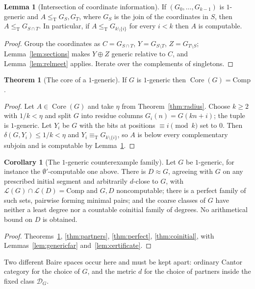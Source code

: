 \documentclass[11pt,letterpaper]{article}
\theoremstyle{definition}
\newtheorem{theorem}[definition]{Theorem}
\newtheorem{lemma}[definition]{Lemma}
\newtheorem{corollary}[definition]{Corollary}
\numberwithin{equation}{section}
\newcommand{\leT}{\le_{\mathrm T}}
\newcommand{\eqT}{\equiv_{\mathrm T}}
\newcommand{\DX}[1]{\mathcal D_{#1}}
\newcommand{\Low}{\mathcal L}
\newcommand{\Core}{\operatorname{Core}}
\newcommand{\Comp}{\mathrm{Comp}}
\newcommand{\src}[1]{\leavevmode{\sffamily\footnotesize\color{Steel}[#1]}}
\begin{document}
\begin{lemma}[Intersection of coordinate information]\label{lem:intersect}\src{R1}
If $(G_0,\dots,G_{k-1})$ is $1$-generic and $A\leT G_S,G_T$, where $G_S$ is the join of the coordinates in $S$, then $A\leT G_{S\cap T}$. In particular, if $A\leT G_{k\setminus\{i\}}$ for every $i<k$ then $A$ is computable.
\end{lemma}
\begin{proof}
Group the coordinates as $C=G_{S\cap T}$, $Y=G_{S\setminus T}$, $Z=G_{T\setminus S}$; Lemma~\ref{lem:sections} makes $Y\oplus Z$ generic relative to $C$, and Lemma~\ref{lem:relmeet} applies. Iterate over the complements of singletons.
\end{proof}

\begin{theorem}[The core of a $1$-generic]\label{thm:genericcore}\src{R1; = \cite[Theorem~4.2]{HJKS}}
If $G$ is $1$-generic then $\Core(G)=\Comp$.
\end{theorem}
\begin{proof}
Let $A\in\Core(G)$ and take $\eta$ from Theorem~\ref{thm:radius}. Choose $k\ge2$ with $1/k<\eta$ and split $G$ into residue columns $G_i(n)=G(kn+i)$; the tuple is $1$-generic. Let $Y_i$ be $G$ with the bits at positions $\equiv i\pmod k$ set to $0$. Then $\delta(G,Y_i)\le1/k<\eta$ and $Y_i\eqT G_{k\setminus\{i\}}$, so $A$ is below every complementary subjoin and is computable by Lemma~\ref{lem:intersect}.
\end{proof}

\begin{corollary}[The $1$-generic counterexample family]\label{cor:generic}\src{R1}
Let $G$ be $1$-generic, for instance the $\emptyset'$-computable one above. There is $D\approx G$, agreeing with $G$ on any prescribed initial segment and arbitrarily $d$-close to $G$, with $\Low(G)\cap\Low(D)=\Comp$ and $G,D$ noncomputable; there is a perfect family of such sets, pairwise forming minimal pairs; and the coarse classes of $G$ have neither a least degree nor a countable coinitial family of degrees. No arithmetical bound on $D$ is obtained.
\end{corollary}
\begin{proof}
Theorems~\ref{thm:genericcore}, \ref{thm:partners}, \ref{thm:perfect}, \ref{thm:coinitial}, with Lemmas~\ref{lem:genericfar} and~\ref{lem:certificate}.
\end{proof}
Two different Baire spaces occur here and must be kept apart: ordinary Cantor category for the choice of $G$, and the metric $d$ for the choice of partners inside the fixed class $\DX G$.
\end{document}
